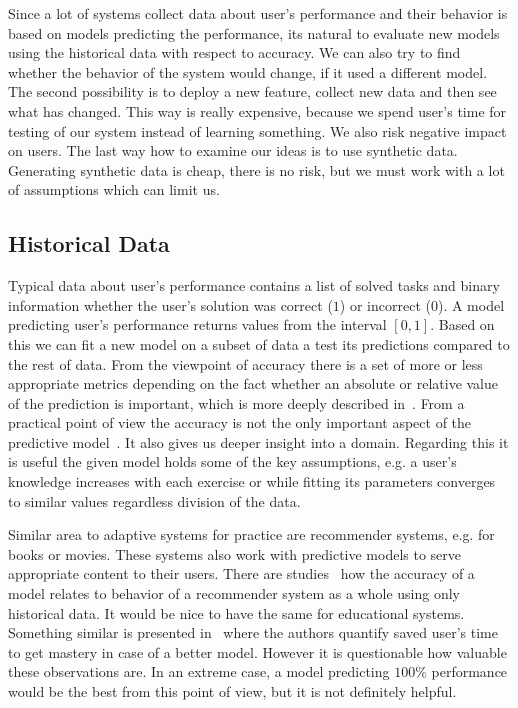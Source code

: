 \documentclass[table,color,cover,twoside,nolot,nolof]{fithesis3/fithesis3}
\begin{document}
Since a lot of systems collect data about user's performance and their
behavior is based on models predicting the performance, its natural to
evaluate new models using the historical data with respect to accuracy. We can
also try to find whether the behavior of the system would change, if it used a
different model. The second possibility is to deploy a new feature, collect new
data and then see what has changed. This way is really expensive, because we
spend user's time for testing of our system instead of learning something. We
also risk negative impact on users. The last way how to examine our ideas is to
use synthetic data. Generating synthetic data is cheap, there is no risk, but
we must work with a lot of assumptions which can limit us.

\subsection{Historical Data}

Typical data about user's performance contains a list of solved tasks and
binary information whether the user's solution was correct ($1$) or incorrect
($0$). A model predicting user's performance returns values from the interval
$[0, 1]$. Based on this we can fit a new model on a subset of data a test its
predictions compared to the rest of data. From the viewpoint of accuracy there
is a set of more or less appropriate metrics depending on the fact whether an
absolute or relative value of the prediction is important, which is more deeply
described in~\cite{pelanek2014brief}.  From a practical point of view the
accuracy is not the only important aspect of the predictive
model~\cite{huang2015framework}. It also gives us deeper insight into a domain.
Regarding this it is useful the given model holds some of the key assumptions,
e.g. a user's knowledge increases with each exercise or while fitting its
parameters converges to similar values regardless division of the data.

Similar area to adaptive systems for practice are recommender systems, e.g. for
books or movies. These systems also work with predictive models to serve
appropriate content to their users. There are
studies~\cite{cremonesi2010performance} how the accuracy of a model relates to
behavior of a recommender system as a whole using only historical data. It
would be nice to have the same for educational systems. Something similar is
presented in~\cite{yudelson2015small} where the authors quantify saved user's
time to get mastery in case of a better model. However it is questionable how
valuable these observations are. In an extreme case, a model predicting $100\%$
performance would be the best from this point of view, but it is not definitely
helpful.
\end{document}
